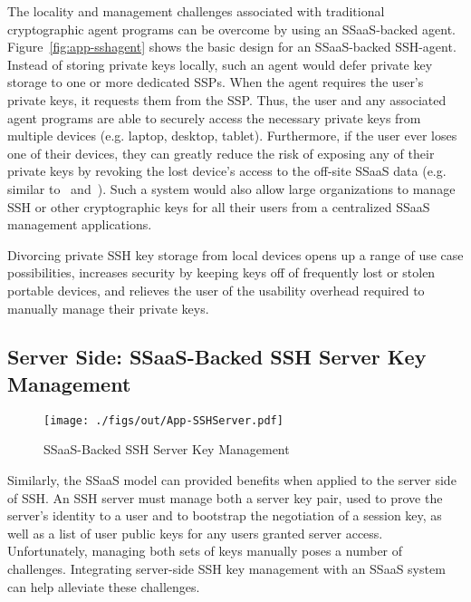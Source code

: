 The locality and management challenges associated with traditional
cryptographic agent programs can be overcome by using an SSaaS-backed
agent. Figure~\ref{fig:app-sshagent} shows the basic design for an
SSaaS-backed SSH-agent. Instead of storing private keys locally, such
an agent would defer private key storage to one or more dedicated
SSPs. When the agent requires the user's private keys, it requests
them from the SSP. Thus, the user and any associated agent programs
are able to securely access the necessary private keys from multiple
devices (e.g. laptop, desktop, tablet). Furthermore, if the user ever
loses one of their devices, they can greatly reduce the risk of
exposing any of their private keys by revoking the lost device's
access to the off-site SSaaS data (e.g. similar to~\cite{geambasu2011}
and~\cite{tang2012}). Such a system would also allow large
organizations to manage SSH or other cryptographic keys for all their
users from a centralized SSaaS management applications.

Divorcing private SSH key storage from local devices opens up a range
of use case possibilities, increases security by keeping keys off of
frequently lost or stolen portable devices, and relieves the user of
the usability overhead required to manually manage their private keys.

\subsection{Server Side: SSaaS-Backed SSH Server Key Management}

\begin{figure}[t]
  \centering
  \texttt{[image: ./figs/out/App-SSHServer.pdf]}
  \caption{SSaaS-Backed SSH Server Key Management}
  \label{fig:apps-sshserver}
\end{figure}

Similarly, the SSaaS model can provided benefits when applied to the
server side of SSH. An SSH server must manage both a server key pair,
used to prove the server's identity to a user and to bootstrap the
negotiation of a session key, as well as a list of user public keys
for any users granted server access. Unfortunately, managing both sets
of keys manually poses a number of challenges. Integrating server-side
SSH key management with an SSaaS system can help alleviate these
challenges.

